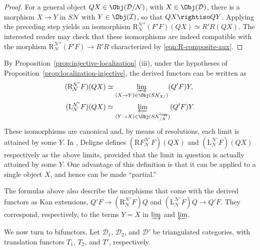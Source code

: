 \begin{proof}
	For a general object $QX\in\Obj(\mathcal{D}/\mathcal{N})$, with
	$X\in\Obj(\mathcal{D})$, there is a morphism $X\to Y$ in
	$S\mathcal{N}$ with $Y\in\Obj(\mathcal{I})$, so that
	$QX\rightiso QY$. Applying the preceding step yields an isomorphism
	$\mathrm{R}^{\mathcal{N}''}_{\mathcal{N}}(F'F)(QX)\simeq R'R(QX)$.
	The interested reader may check that these isomorphisms are indeed
	compatible with the morphism
	$\mathrm{R}^{\mathcal{N}''}_{\mathcal{N}}(F'F)\to R'R$ characterized by
	\eqref{eqn:R-composite-aux}.
\end{proof}

\begin{remark}\label{rem:Deligne-derived-functor}
	By Proposition~\ref{prop:injective-localization} (iii), under the hypotheses
	of Proposition~\ref{prop:localization-injective}, the derived functors can be
	written as
	\begin{align*}
		(\mathrm{R}_{\mathcal{N}}^{\mathcal{N}'} F)(QX) & \simeq \varinjlim_{(X \to Y) \in \Obj(S\mathcal{N}_{X/})} (Q'F)Y, \\
		(\mathrm{L}_{\mathcal{N}}^{\mathcal{N}'} F)(QX) & \simeq \varprojlim_{(Y \to X) \in \Obj(S\mathcal{N}_{/X}^{\opp})} (Q'F)Y.
	\end{align*}
	These isomorphisms are canonical and, by means of resolutions, each limit
	is attained by some $Y$. In \cite[Exp XVII, Déf 1.2.1]{SGA4-3}, Deligne
	defines $(\mathrm{R}F_{\mathcal{N}}^{\mathcal{N}'} F)(QX)$ and
	$(\mathrm{L}_{\mathcal{N}}^{\mathcal{N}'} F)(QX)$ respectively as the
	above limits, provided that the limit in question is actually attained by
	some $Y$. One advantage of this definition is that it can be applied to a
	single object $X$, and hence can be made ``partial.''

	The formulas above also describe the morphisms that come with the derived
	functors as Kan extensions,
	$Q'F\to(\mathrm{R}^{\mathcal{N}'}_{\mathcal{N}}F)Q$ and
	$(\mathrm{L}^{\mathcal{N}'}_{\mathcal{N}}F)Q\to Q'F$. They correspond,
	respectively, to the terms $Y=X$ in $\varinjlim$ and $\varprojlim$.
\end{remark}

We now turn to bifunctors. Let $\mathcal{D}_1$, $\mathcal{D}_2$, and
$\mathcal{D}'$ be triangulated categories, with translation functors
$T_1$, $T_2$, and $T'$, respectively.

